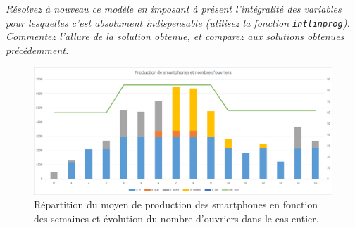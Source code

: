 \question %
\emph{Résolvez à nouveau ce modèle en imposant à présent l'intégralité des
variables pour lesquelles c'est absolument indispensable
(utilisez la fonction \texttt{intlinprog}).
Commentez l'allure de la solution obtenue,
et comparez aux solutions obtenues précédemment.}

\begin{figure}[H]
  \begin{center}
    \includegraphics[scale = 0.8]{img/grapheProductionOuv.png}
	  \caption{Répartition du moyen de production des smartphones en fonction des semaines et évolution du nombre d'ouvriers dans le cas entier.}
	  \label{fig:grapheProductionOuv}
  \end{center}
\end{figure}